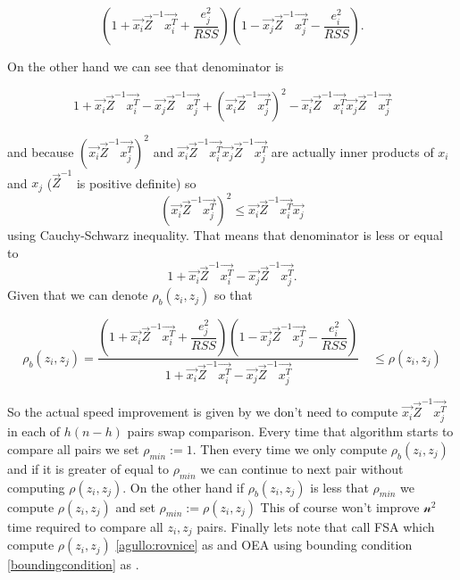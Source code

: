 \begin{equation}
	(1+\vec{x_i}\vec{Z}^{-1}\vec{x_i^T} + \dfrac{e_j^2}{RSS})
(1 - \vec{x_j}\vec{Z}^{-1}\vec{x_j^T} - \dfrac{e_i^2}{RSS} ).
\end{equation}

On the other hand we can see that denominator is

\begin{equation}
	1 + \vec{x_i}\vec{Z}^{-1}\vec{x_i^T}  - \vec{x_j}\vec{Z}^{-1}\vec{x_j^T}  + (\vec{x_i}\vec{Z}^{-1}\vec{x_j^T})^2 -   \vec{x_i}\vec{Z}^{-1}\vec{x_i^T}\vec{x_j}\vec{Z}^{-1}\vec{x_j^T} 
\end{equation}

and because $(\vec{x_i}\vec{Z}^{-1}\vec{x_j^T})^2$ and $\vec{x_i}\vec{Z}^{-1}\vec{x_i^T}\vec{x_j}\vec{Z}^{-1}\vec{x_j^T} $ are actually inner products of $x_i$ and $x_j$  ($\vec{Z}^{-1}$ is positive definite) so 
\begin{equation}
	(\vec{x_i}\vec{Z}^{-1}\vec{x_j^T})^2 \leq \vec{x_i}\vec{Z}^{-1}\vec{x_i^T}\vec{x_j}
\end{equation}
using Cauchy-Schwarz inequality. That means that denominator is less or equal to
\begin{equation}
	1 + \vec{x_i}\vec{Z}^{-1}\vec{x_i^T}  - \vec{x_j}\vec{Z}^{-1}\vec{x_j^T}.
\end{equation}
Given that we can denote $\rho_b(z_i, z_j)$ so that


\begin{equation} \label{boundingcondition}
	\rho_b(z_i, z_j) = \dfrac{(1+\vec{x_i}\vec{Z}^{-1}\vec{x_i^T} + \dfrac{e_j^2}{RSS})
	(1 - \vec{x_j}\vec{Z}^{-1}\vec{x_j^T} - \dfrac{e_i^2}{RSS} )}{1 + \vec{x_i}\vec{Z}^{-1}\vec{x_i^T}  - \vec{x_j}\vec{Z}^{-1}\vec{x_j^T}} \quad \leq \rho(z_i, z_j)
\end{equation}

So the actual speed improvement is given by we don't need to compute $\vec{x_i}\vec{Z}^{-1}\vec{x_j^T}$ in each of $h(n-h)$ pairs swap comparison. Every time that algorithm starts to compare all pairs we set $\rho_{min} :=1$. Then every time we only compute $\rho_b(z_i, z_j)$ and if it is greater of equal to $\rho_{min}$ we can continue to next pair without computing $\rho(z_i, z_j)$. On the other hand if $\rho_b(z_i, z_j)$ is less that  $\rho_{min}$ we compute $\rho(z_i, z_j)$ and set $\rho_{min} := \rho(z_i, z_j)$ This of course won't improve $\mathcal{n^2}$ time required to compare all $z_i, z_j$ pairs.
Finally lets note that \cite{agullo2001new} call FSA  which compute $\rho(z_i, z_j)$  \ref{agullo:rovnice} as  and OEA using bounding condition \ref{boundingcondition} as  .

